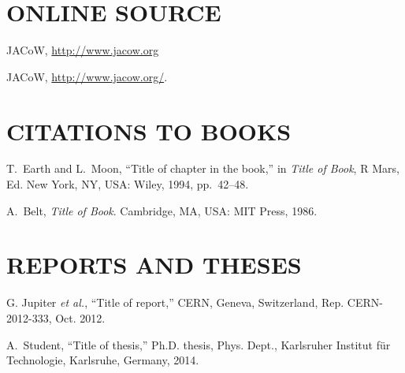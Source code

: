 \vspace*{-.5\baselineskip}
\section{ONLINE SOURCE}

\begin{thebibliography}{99} %
  \setcounter{enumi}{11}
		JACoW, \url{http://www.jacow.org} 

  \setcounter{enumi}{11}
		JACoW, \url{http://www.jacow.org/}.  

\end{thebibliography}

\section{CITATIONS TO BOOKS}

\begin{thebibliography}{99} %
	\setcounter{enumi}{12}
		T.~Earth and L.~Moon,
		“Title of chapter in the book,”
		in \emph{Title of Book}, R Mars, Ed. New York, NY, USA:
		Wiley, 1994, pp.~42--48. 
	
		A.~Belt, \emph{Title of Book}. Cambridge, MA, USA:
		MIT Press, 1986. 
\end{thebibliography}

\section{REPORTS AND THESES}

\begin{thebibliography}{99} %
	\setcounter{enumi}{14}
		G. Jupiter \emph{et al.},
		“Title of report,” CERN, Geneva, Switzerland,
		Rep. CERN-2012-333, Oct. 2012.

		A.~Student, “Title of thesis,”
		Ph.D. thesis, Phys. Dept.,
		Karlsruher Institut für Technologie, Karlsruhe,
		Germany, 2014.
\end{thebibliography}

